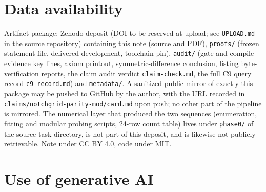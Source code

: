 \documentclass[11pt]{article}
\begin{document}
\section*{Data availability}

Artifact package: Zenodo deposit (DOI to be reserved at upload; see
\texttt{UPLOAD.md} in the source repository) containing this note (source and
PDF),
\texttt{proofs/} (frozen statement file, delivered development, toolchain pin),
\texttt{audit/} (gate and compile evidence key lines, axiom printout,
symmetric-difference conclusion, listing byte-verification reports, the claim
audit verdict \texttt{claim-check.md}, the full C9 query record
\texttt{c9-record.md}) and \texttt{metadata/}. A sanitized public mirror of
exactly this package may be pushed to GitHub by the author, with the URL recorded
in \texttt{claims/notchgrid-parity-mod/card.md} upon push; no other part of the
pipeline is mirrored. The numerical layer that produced the two sequences
(enumeration, fitting and modular probing scripts, 24-row count table) lives under
\texttt{phase0/} of the source task directory, is not part of this deposit, and is
likewise not publicly retrievable. Note under CC BY 4.0, code under MIT.

\section*{Use of generative AI}
\end{document}
